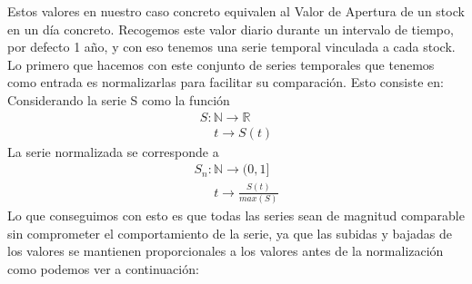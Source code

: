 \documentclass[12pt,a4paper]{article}
\begin{document}
		Estos valores en nuestro caso concreto equivalen al Valor de Apertura de un stock en un día concreto. Recogemos este valor diario durante un intervalo de tiempo, por defecto 1 año, y con eso tenemos una serie temporal vinculada a cada stock.\\
		Lo primero que hacemos con este conjunto de series temporales que tenemos como entrada es normalizarlas para facilitar su comparación. Esto consiste en:\\
		Considerando la serie S como la función
		\[\begin{array}{lcc}
		S:\mathbb{N}\rightarrow\mathbb{R}\\
 		\ \ \ \ \ t\rightarrow S(t)
		\end{array}\]
		La serie normalizada se corresponde a
		\[\begin{array}{lcc}
		S_n:\mathbb{N}\rightarrow(0,1]\\
 		\ \ \ \ \ \ \ t\rightarrow \frac{S(t)}{max(S)}
		\end{array}\]
		Lo que conseguimos con esto es que todas las series sean de magnitud comparable sin comprometer el comportamiento de la serie, ya que las subidas y bajadas de los valores se mantienen proporcionales a los valores antes de la normalización como podemos ver a continuación:\\
\end{document}
